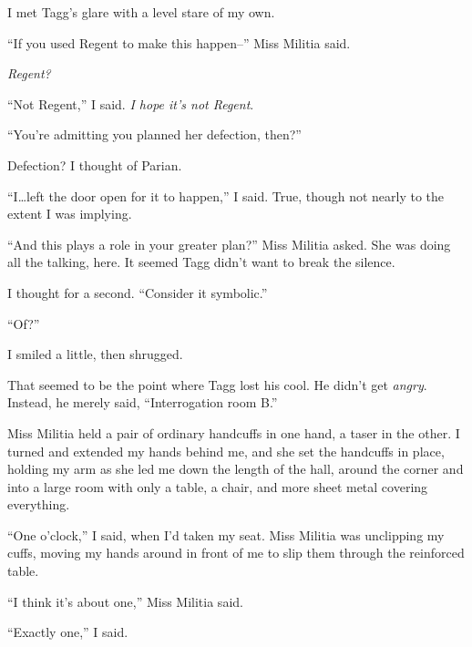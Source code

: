 I met Tagg's glare with a level stare of my own.



``If you used Regent to make this happen--'' Miss Militia said.



\emph{Regent?}



``Not Regent,'' I said.  \emph{I hope it's not Regent}.



``You're admitting you planned her defection, then?''



Defection?  I thought of Parian.



``I\ldots left the door open for it to happen,'' I said.  True, though not nearly to the extent I was implying.



``And this plays a role in your greater plan?'' Miss Militia asked.  She was doing all the talking, here.  It seemed Tagg didn't want to break the silence.



I thought for a second.  ``Consider it symbolic.''



``Of?''



I smiled a little, then shrugged.



That seemed to be the point where Tagg lost his cool.  He didn't get \emph{angry}.  Instead, he merely said, ``Interrogation room B.''



Miss Militia held a pair of ordinary handcuffs in one hand, a taser in the other.  I turned and extended my hands behind me, and she set the handcuffs in place, holding my arm as she led me down the length of the hall, around the corner and into a large room with only a table, a chair, and more sheet metal covering everything.



``One o'clock,'' I said, when I'd taken my seat.  Miss Militia was unclipping my cuffs, moving my hands around in front of me to slip them through the reinforced table.



``I think it's about one,'' Miss Militia said.



``Exactly one,'' I said.



